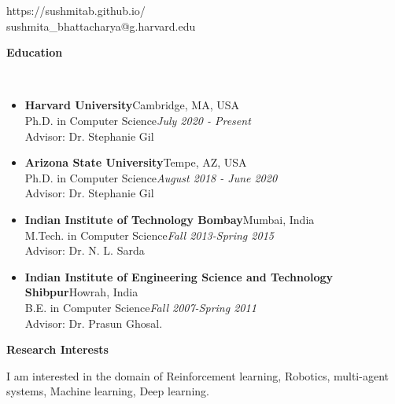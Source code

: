 \documentclass[a4paper,11pt]{article}
\newcommand{\lsep}{-0.5cm}
\newcommand{\resheading}[1]{{\small \colorbox{mygrey}{\begin{minipage}{0.975\textwidth}{\textbf{#1 \vphantom{p\^{E}}}}\end{minipage}}}}
\begin{document}
\hfill https://sushmitab.github.io/\\
\hfill sushmita\_bhattacharya@g.harvard.edu\\
\setlength{\tabcolsep}{5pt}

\vspace{10pt}

\resheading{\textbf{\large Education} }\\[\lsep]
\begin{description}
\item 
\begin{itemize}
\item \textbf{Harvard  University}\hfill Cambridge, MA, USA\\
Ph.D. in Computer Science\hfill \textit{July 2020 - Present}\\
Advisor: Dr. Stephanie Gil
\end{itemize}
\item
\begin{itemize}
\item \textbf{Arizona State University}\hfill Tempe, AZ, USA\\
	Ph.D. in Computer Science\hfill \textit{August 2018 - June 2020}\\
	Advisor: Dr. Stephanie Gil
\end{itemize}
\item
\begin{itemize}
\item \textbf{Indian Institute of Technology Bombay}\hfill Mumbai, India\\
	M.Tech. in Computer Science\hfill \textit{Fall 2013-Spring 2015}\\
	Advisor: Dr. N. L. Sarda
\end{itemize}
\item
\begin{itemize}
\item \textbf{Indian Institute of Engineering Science and Technology Shibpur}\hfill Howrah, India\\
	B.E. in Computer Science\hfill \textit{Fall 2007-Spring 2011}\\
	Advisor: Dr. Prasun Ghosal.
\end{itemize}
\end{description}

\resheading{\textbf{\large Research Interests}}
\begin{description}
	\item \hspace{0.75 cm} I am interested in the domain of Reinforcement learning, Robotics, multi-agent systems, Machine learning, Deep learning.
\end{description}
\end{document}
